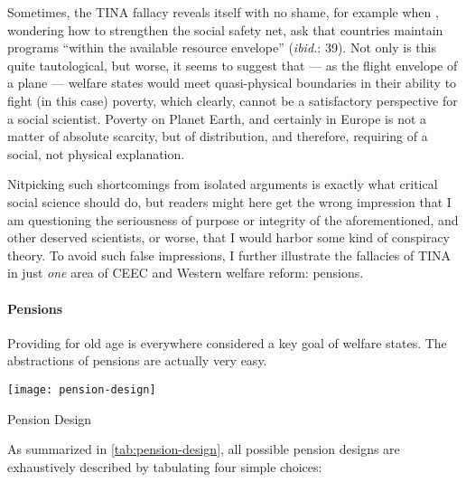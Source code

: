 Sometimes, the TINA fallacy reveals itself with no shame, for example when \cite{Grow2005}, wondering how to strengthen the social safety net, ask that countries maintain programs ``within the available resource envelope'' (\emph{ibid.}: 39). Not only is this quite tautological, but worse, it seems to suggest that --- as the flight envelope of a plane --- welfare states would meet quasi-physical boundaries in their ability to fight (in this case) poverty, which clearly, cannot be a satisfactory perspective for a social scientist. Poverty on Planet Earth, and certainly in Europe is not a matter of absolute scarcity, but of distribution, and therefore, requiring of a social, not physical explanation.

Nitpicking such shortcomings from isolated arguments is exactly what critical social science should do, but readers might here get the wrong impression that I am questioning the seriousness of purpose or integrity of the aforementioned, and other deserved scientists, or worse, that I would harbor some kind of conspiracy theory. To avoid such false impressions, I further illustrate the fallacies of TINA in just \emph{one} area of \gls{CEEC} and Western welfare reform: pensions. %

\paragraph{Pensions}  \label{sec:pensions}
Providing for old age is everywhere considered a key goal of welfare states. The abstractions of pensions are actually very easy.

 \begin{table}[htbp]
	\centering
	\texttt{[image: pension-design]}
	\caption{Pension Design}
	\label{tab:pension-design}
\end{table}%

As summarized in \autoref{tab:pension-design}, all possible pension designs are exhaustively described by tabulating four simple choices:

